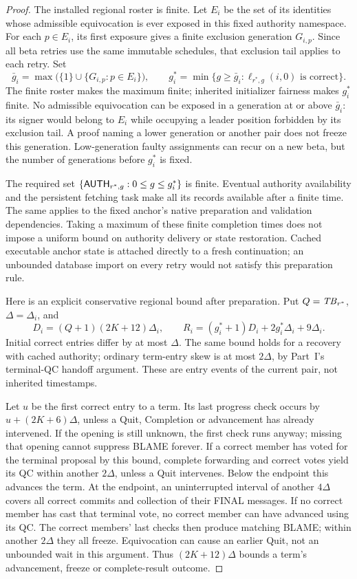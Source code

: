 \begin{proof}
The installed regional roster is finite. Let $E_i$ be the set of its
identities whose admissible equivocation is ever exposed in this fixed
authority namespace. For each $p\in E_i$, its first exposure gives a
finite exclusion generation $G_{i,p}$. Since all beta retries use the
same immutable schedules, that exclusion tail applies to each retry.
Set
\[
 \bar g_i=\max\bigl(\{1\}\cup\{G_{i,p}:p\in E_i\}\bigr),\qquad
 g_i^*=\min\{g\ge\bar g_i:
                   \ell_{r^*,g}(i,0)\text{ is correct}\}.
\]
The finite roster makes the maximum finite; inherited initializer
fairness makes $g_i^*$ finite. No admissible equivocation can be exposed
in a generation at or above $\bar g_i$: its signer would belong to
$E_i$ while occupying a leader position forbidden by its exclusion
tail. A proof naming a lower generation or another pair does not freeze
this generation. Low-generation faulty assignments can recur on a new
beta, but the number of generations before $g_i^*$ is fixed.

The required set $\{\mathsf{AUTH}_{r^*,g}:0\le g\le g_i^*\}$ is finite.
Eventual authority availability and the persistent fetching task make
all its records available after a finite time. The same applies to the
fixed anchor's native preparation and validation dependencies. Taking
a maximum of these finite completion times does not impose a uniform
bound on authority delivery or state restoration. Cached executable
anchor state is attached directly to a fresh continuation; an unbounded
database import on every retry would not satisfy this preparation rule.

Here is an explicit conservative regional bound after preparation.
Put $Q=\mathit{TB}_{r^*}$, $\Delta=\Delta_i$, and
\[
 D_i=(Q+1)(2K+12)\Delta_i,\qquad
 R_i=(g_i^*+1)D_i+2g_i^*\Delta_i+9\Delta_i.
\]
Initial correct entries differ by at most $\Delta$. The same bound
holds for a recovery with cached authority; ordinary term-entry skew
is at most $2\Delta$, by Part~I's terminal-QC handoff argument. These
are entry events of the current pair, not inherited timestamps.

Let $u$ be the first correct entry to a term. Its last progress check
occurs by $u+(2K+6)\Delta$, unless a Quit, Completion or advancement
has already intervened. If the opening is still unknown, the first
check runs anyway; missing that opening cannot suppress BLAME forever.
If a correct member has voted for the terminal proposal by this bound,
complete forwarding and correct votes yield its QC within another
$2\Delta$, unless a Quit intervenes. Below the endpoint this advances
the term. At the endpoint, an uninterrupted interval of another
$4\Delta$ covers all correct commits and collection of their FINAL
messages. If no correct member has cast that terminal vote, no correct
member can have advanced using its QC. The correct members' last
checks then produce matching BLAME; within another $2\Delta$ they all
freeze. Equivocation can cause an earlier Quit, not an unbounded wait
in this argument. Thus $(2K+12)\Delta$ bounds a term's advancement,
freeze or complete-result outcome.


\end{proof}

